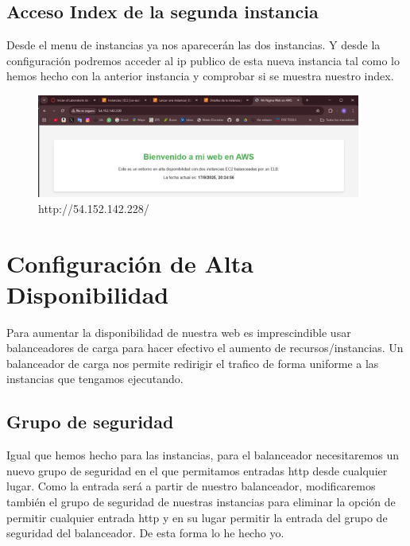 \documentclass{article}
\begin{document}
\newpage

\subsection{Acceso Index de la segunda instancia}

	Desde el menu de instancias ya nos aparecerán las dos instancias. Y desde la configuración podremos acceder al ip publico de esta nueva instancia tal como lo hemos hecho con la anterior instancia y comprobar si se muestra nuestro index.

	\begin{figure}[H]
	\centering
	\includegraphics[width=0.95\textwidth]{index2.png}
	\caption{http://54.152.142.228/}
	\end{figure}
\newpage

\section{Configuración de Alta Disponibilidad}
	Para aumentar la disponibilidad de nuestra web es imprescindible usar balanceadores de carga para hacer efectivo el aumento de recursos/instancias. Un balanceador de carga nos permite redirigir el trafico de forma uniforme a las instancias que tengamos ejecutando. 
	

\subsection{Grupo de seguridad}

	Igual que hemos hecho para las instancias, para el balanceador necesitaremos un nuevo grupo de seguridad en el que permitamos entradas http desde cualquier lugar. Como la entrada será a partir de nuestro balanceador, modificaremos también el grupo de seguridad de nuestras instancias para eliminar la opción de permitir cualquier entrada http y en su lugar permitir la entrada del grupo de seguridad del balanceador. De esta forma lo he hecho yo.
\end{document}
